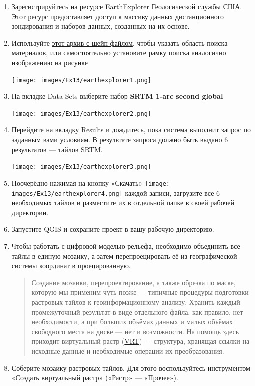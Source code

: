\documentclass[
  12pt,
]{book}
\begin{document}
\begin{enumerate}
\def\labelenumi{\arabic{enumi}.}
\item
  Зарегистрируйтесь на ресурсе \href{https://earthexplorer.usgs.gov/}{EarthExplorer} Геологической службы США. Этот ресурс предоставляет доступ к массиву данных дистанционного зондирования и наборов данных, созданных на их основе.
\item
  Используйте \href{https://1drv.ms/u/s!AmtmZDq3JgxHgZY2yqR_DOlBpv0ZDw?e=U0dvNG}{этот архив с шейп-файлом}, чтобы указать область поиска материалов, или самостоятельно установите рамку поиска аналогично изображению на рисунке

  \texttt{[image: images/Ex13/earthexplorer1.png]}
\item
  На вкладке Data Sets выберите набор \textbf{SRTM 1-arc second global}

  \texttt{[image: images/Ex13/earthexplorer2.png]}
\item
  Перейдите на вкладку Results и дождитесь, пока система выполнит запрос по заданным вами условиям. В результате запроса должно быть выдано 6 результатов --- тайлов SRTM.

  \texttt{[image: images/Ex13/earthexplorer3.png]}
\item
  Поочерёдно нажимая на кнопку «Скачать» \texttt{[image: images/Ex13/earthexplorer4.png]} каждой записи, загрузите все 6 необходимых тайлов и разместите их в отдельной папке в своей рабочей директории.
\item
  Запустите QGIS и сохраните проект в вашу рабочую директорию.
\item
  Чтобы работать с цифровой моделью рельефа, необходимо объединить все тайлы в единую мозаику, а затем перепроецировать её из географической системы координат в проецированную.

  \begin{quote}
  Создание мозаики, перепроектирование, а также обрезка по маске, которую мы применим чуть позже --- типичные процедуры подготовки растровых тайлов к геоинформационному анализу. Хранить каждый промежуточный результат в виде отдельного файла, как правило, нет необходимости, а при больших объёмах данных и малых объёмах свободного места на диске --- нет и возможности. На помощь здесь приходит виртуальный растр (\href{https://gdal.org/drivers/raster/vrt.html}{VRT}) --- структура, хранящая ссылки на исходные данные и необходимые операции их преобразования.
  \end{quote}
\item
  Соберите мозаику растровых тайлов. Для этого воспользуйтесь инструментом «Создать виртуальный растр» («Растр» --- «Прочее»).


\end{enumerate}
\end{document}
